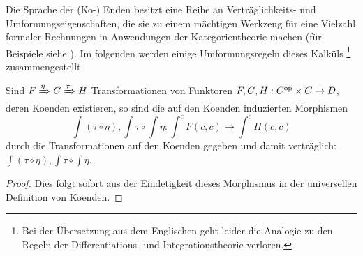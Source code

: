 Die Sprache der (Ko-) Enden besitzt eine Reihe an Verträglichkeits-
und Umformungseigenschaften, die sie zu einem mächtigen Werkzeug für
eine Vielzahl formaler Rechnungen in Anwendungen der Kategorientheorie
machen (für Beispiele siehe \cite{Lore}). Im folgenden werden einige
Umformungsregeln dieses Kalküls \footnote{Bei der Übersetzung
  aus dem Englischen geht leider die Analogie zu den Regeln der
  Differentiations- und Integrationstheorie verloren.}
zusammengestellt.


\begin{lemma}
  Sind $F \xRightarrow{\eta} G \xRightarrow{\tau} H$ Transformationen
  von Funktoren $F, G, H: C^\mathrm{op} \times C \to D$, deren Koenden
  existieren, so sind die auf den Koenden induzierten Morphismen
  \[ \int (\tau \circ \eta), \int \tau \circ \int \eta:
  \int^c F(c, c) \to \int^c H(c, c) \]
  durch die Transformationen auf den Koenden gegeben und damit
  verträglich: $\int (\tau \circ \eta), \int \tau \circ \int \eta$.
\end{lemma}
\begin{proof}
  Dies folgt sofort aus der Eindetigkeit dieses Morphismus in der
  universellen Definition von Koenden.
\end{proof}


